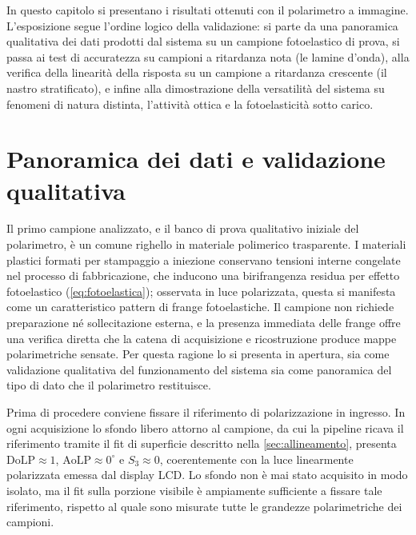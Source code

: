 
In questo capitolo si presentano i risultati ottenuti con il polarimetro a immagine. L'esposizione segue l'ordine logico della validazione: si parte da una panoramica qualitativa dei dati prodotti dal sistema su un campione fotoelastico di prova, si passa ai test di accuratezza su campioni a ritardanza nota (le lamine d'onda), alla verifica della linearità della risposta su un campione a ritardanza crescente (il nastro stratificato), e infine alla dimostrazione della versatilità del sistema su fenomeni di natura distinta, l'attività ottica e la fotoelasticità sotto carico.

\section{Panoramica dei dati e validazione qualitativa}
\label{sec:panoramica_righello}

Il primo campione analizzato, e il banco di prova qualitativo iniziale del polarimetro, è un comune righello in materiale polimerico trasparente. I materiali plastici formati per stampaggio a iniezione conservano tensioni interne congelate nel processo di fabbricazione, che inducono una birifrangenza residua per effetto fotoelastico (\cref{eq:fotoelastica}); osservata in luce polarizzata, questa si manifesta come un caratteristico pattern di frange fotoelastiche. Il campione non richiede preparazione né sollecitazione esterna, e la presenza immediata delle frange offre una verifica diretta che la catena di acquisizione e ricostruzione produce mappe polarimetriche sensate. Per questa ragione lo si presenta in apertura, sia come validazione qualitativa del funzionamento del sistema sia come panoramica del tipo di dato che il polarimetro restituisce.

Prima di procedere conviene fissare il riferimento di polarizzazione in ingresso. In ogni acquisizione lo sfondo libero attorno al campione, da cui la pipeline ricava il riferimento tramite il fit di superficie descritto nella \cref{sec:allineamento}, presenta $\mathrm{DoLP} \approx 1$, $\mathrm{AoLP} \approx 0^\circ$ e $S_3 \approx 0$, coerentemente con la luce linearmente polarizzata emessa dal display LCD. Lo sfondo non è mai stato acquisito in modo isolato, ma il fit sulla porzione visibile è ampiamente sufficiente a fissare tale riferimento, rispetto al quale sono misurate tutte le grandezze polarimetriche dei campioni.

